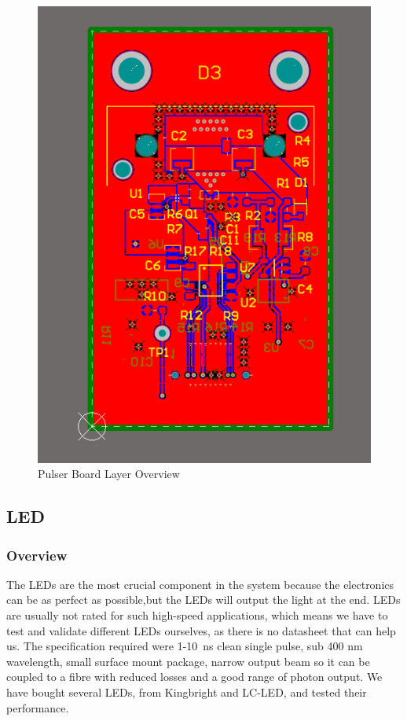 \documentclass[a4paper,11pt]{article}
\begin{document}
\begin{figure}[htbp]
\centering
\includegraphics[scale=0.5]{PulserBoard0.9Overview.png}
\caption{Pulser Board Layer Overview\label{fig:PulserBoard0.9Overview}}
\end{figure}

\subsection{LED}

\subsubsection{Overview}

The LEDs are the most crucial component in the system because the electronics can be as perfect as possible,but the LEDs will output the light at the end. LEDs are usually not rated for such high-speed applications, which means we have to test and validate different LEDs ourselves, as there is no datasheet that can help us. The specification required were 1-10~ns clean single pulse, sub 400 nm wavelength, small surface mount package, narrow output beam so it can be coupled to a fibre with reduced losses and a good range of photon output. We have bought several LEDs, from Kingbright and LC-LED, and tested their performance.
\end{document}
